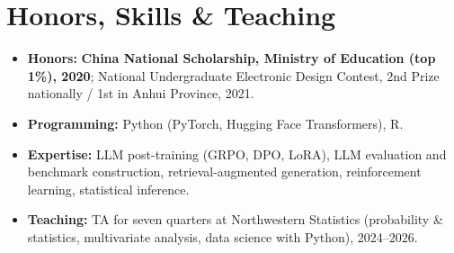 \documentclass[10.5pt]{article}
\newenvironment{bullets}
  {\begin{itemize}[leftmargin=1.35em, topsep=2.5pt, itemsep=2pt, parsep=0pt,
                   label=\textcolor{accent}{\footnotesize$\bullet$}]\small}
  {\end{itemize}}
\begin{document}
\section{Honors, Skills \& Teaching}
\begin{bullets}
  \item \textbf{Honors:} \textbf{China National Scholarship, Ministry of Education (top 1\%), 2020};
        National Undergraduate Electronic Design Contest, 2nd Prize nationally / 1st in Anhui Province, 2021.
  \item \textbf{Programming:} Python (PyTorch, Hugging Face Transformers), R.
  \item \textbf{Expertise:} LLM post-training (GRPO, DPO, LoRA), LLM evaluation and benchmark construction,
        retrieval-augmented generation, reinforcement learning, statistical inference.
  \item \textbf{Teaching:} TA for seven quarters at Northwestern Statistics (probability \& statistics,
        multivariate analysis, data science with Python), 2024--2026.
\end{bullets}
\end{document}
